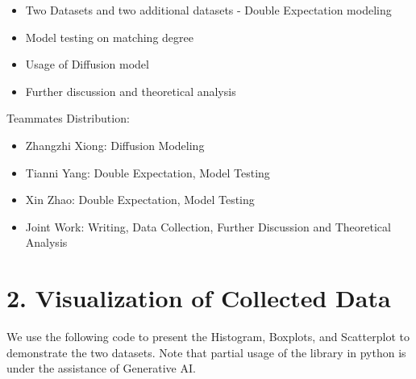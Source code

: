 \documentclass[11pt]{article}
\begin{document}
\begin{itemize}
    \item Two Datasets and two additional datasets - Double Expectation modeling
    \item Model testing on matching degree
    \item Usage of Diffusion model
    \item Further discussion and theoretical analysis
\end{itemize}

Teammates Distribution:

\begin{itemize}
    \item Zhangzhi Xiong: Diffusion Modeling
    \item Tianni Yang: Double Expectation, Model Testing
    \item Xin Zhao: Double Expectation, Model Testing
    \item Joint Work: Writing, Data Collection, Further Discussion and Theoretical Analysis
\end{itemize}

    \section*{2. Visualization of Collected Data}\label{visualization-of-collected-data}

We use the following code to present the Histogram, Boxplots, and
Scatterplot to demonstrate the two datasets. Note that partial usage of
the library in python is under the assistance of Generative AI.
\end{document}

